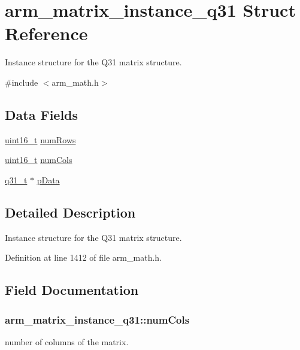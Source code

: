 \hypertarget{structarm__matrix__instance__q31}{\section{arm\-\_\-matrix\-\_\-instance\-\_\-q31 Struct Reference}
\label{structarm__matrix__instance__q31}
}


Instance structure for the Q31 matrix structure.  




{\ttfamily \#include $<$arm\-\_\-math.\-h$>$}

\subsection*{Data Fields}
\begin{DoxyCompactItemize}
\item 
\hyperlink{stdint_8h_a273cf69d639a59973b6019625df33e30}{uint16\-\_\-t} \hyperlink{structarm__matrix__instance__q31_a63bacac158a821c8cfc06088d251598c}{num\-Rows}
\item 
\hyperlink{stdint_8h_a273cf69d639a59973b6019625df33e30}{uint16\-\_\-t} \hyperlink{structarm__matrix__instance__q31_abd161da7614eda927157f18b698074b1}{num\-Cols}
\item 
\hyperlink{arm__math_8h_adc89a3547f5324b7b3b95adec3806bc0}{q31\-\_\-t} $\ast$ \hyperlink{structarm__matrix__instance__q31_a09a64267c0579fef086efc9059741e56}{p\-Data}
\end{DoxyCompactItemize}


\subsection{Detailed Description}
Instance structure for the Q31 matrix structure. 

Definition at line 1412 of file arm\-\_\-math.\-h.



\subsection{Field Documentation}
\hypertarget{structarm__matrix__instance__q31_abd161da7614eda927157f18b698074b1}{
\subsubsection[{num\-Cols}]{ arm\-\_\-matrix\-\_\-instance\-\_\-q31\-::num\-Cols}}\label{structarm__matrix__instance__q31_abd161da7614eda927157f18b698074b1}
number of columns of the matrix. 

